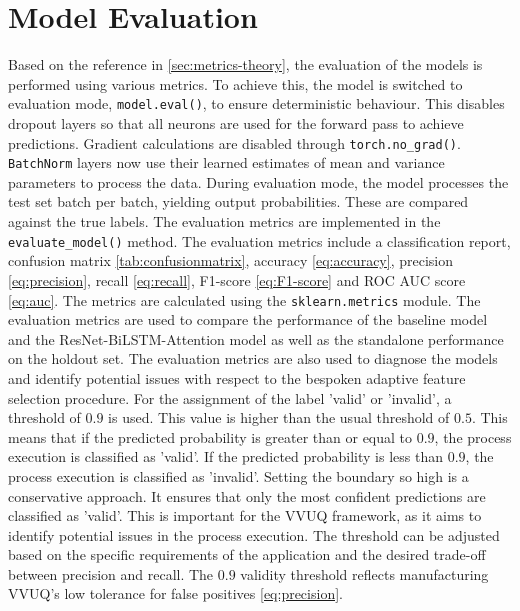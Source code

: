 \section{Model Evaluation}
Based on the reference in \autoref{sec:metrics-theory}, the evaluation of the models is performed using various metrics. To achieve this, the model is switched to evaluation mode, \texttt{model.eval()}, to ensure deterministic behaviour. This disables dropout layers so that all neurons are used for the forward pass to achieve predictions. Gradient calculations are disabled through \texttt{torch.no\_grad()}. \texttt{BatchNorm} layers now use their learned estimates of mean and variance parameters to process the data. During evaluation mode, the model processes the test set batch per batch, yielding output probabilities. These are compared against the true labels. The evaluation metrics are implemented in the \texttt{evaluate\_model()} method. The evaluation metrics include a classification report, confusion matrix \autoref{tab:confusionmatrix}, accuracy \autoref{eq:accuracy}, precision \autoref{eq:precision}, recall \autoref{eq:recall}, F1-score \autoref{eq:F1-score} and ROC AUC score \autoref{eq:auc}. The metrics are calculated using the \texttt{sklearn.metrics} module. The evaluation metrics are used to compare the performance of the baseline model and the ResNet-BiLSTM-Attention model as well as the standalone performance on the holdout set. The evaluation metrics are also used to diagnose the models and identify potential issues with respect to the bespoken adaptive feature selection procedure. For the assignment of the label 'valid' or 'invalid', a threshold of $0.9$ is used. This value is higher than the usual threshold of $0.5$. This means that if the predicted probability is greater than or equal to $0.9$, the process execution is classified as 'valid'. If the predicted probability is less than $0.9$, the process execution is classified as 'invalid'. Setting the boundary so high is a conservative approach. It ensures that only the most confident predictions are classified as 'valid'. This is important for the VVUQ framework, as it aims to identify potential issues in the process execution. The threshold can be adjusted based on the specific requirements of the application and the desired trade-off between precision and recall. The $0.9$ validity threshold reflects manufacturing VVUQ's low tolerance for false positives \autoref{eq:precision}.

